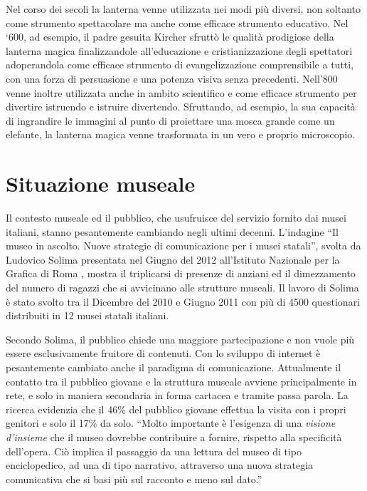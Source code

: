 \begin{itemize}
	Nel corso dei secoli la lanterna venne utilizzata nei modi più diversi, non soltanto come strumento spettacolare ma anche come efficace strumento educativo. Nel ‘600, ad esempio, il padre gesuita Kircher sfruttò le qualità prodigiose della lanterna magica finalizzandole all’educazione e cristianizzazione degli spettatori adoperandola come efficace strumento di evangelizzazione comprensibile a tutti, con una forza di persuasione e una potenza visiva senza precedenti. Nell’800 venne inoltre utilizzata anche in ambito scientifico e come efficace strumento per divertire istruendo e istruire divertendo. Sfruttando, ad esempio, la sua capacità di ingrandire le immagini al punto di proiettare una mosca grande come un elefante, la lanterna magica venne trasformata in un vero e proprio microscopio.
	
\end{itemize}

\section{Situazione museale}
\label{sec:situazione_museale}

Il contesto museale ed il pubblico, che usufruisce del servizio fornito dai musei italiani, stanno pesantemente cambiando negli ultimi decenni.
L’indagine “Il museo in ascolto. Nuove strategie di comunicazione per i musei statali”, svolta da Ludovico Solima presentata nel Giugno del 2012 all’Istituto Nazionale per la Grafica di Roma \cite{MuseoInAscolto}, mostra il triplicarsi di presenze di anziani ed il dimezzamento del numero di ragazzi che si avvicinano alle strutture museali.
Il lavoro di Solima è stato svolto tra il Dicembre del 2010 e Giugno 2011 con più di 4500 questionari distribuiti in 12 musei statali italiani.

Secondo Solima, il pubblico chiede una maggiore partecipazione e non vuole più essere esclusivamente fruitore di contenuti. Con lo sviluppo di internet è pesantemente cambiato anche il paradigma di comunicazione. Attualmente il contatto tra il pubblico giovane e la struttura museale avviene principalmente in rete, e solo in maniera secondaria in forma cartacea e tramite passa parola.
La ricerca evidenzia che il 46\% del pubblico giovane effettua la visita con i propri genitori e solo il 17\% da solo. “Molto importante è l'esigenza di una \textit{visione d'insieme} che il museo dovrebbe contribuire a fornire, rispetto alla specificità dell'opera. Ciò implica il passaggio da una lettura del museo di tipo enciclopedico, ad una di tipo narrativo, attraverso una nuova strategia comunicativa che si basi più sul racconto e meno sul dato.”

